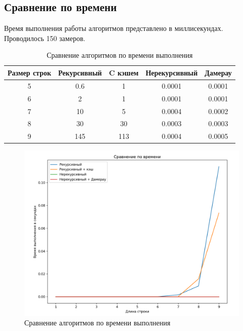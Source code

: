 \documentclass{article}
\begin{document}
\subsection{Сравнение  по времени}
Время выполнения работы алгоритмов представлено в миллисекундах. Проводилось 150 замеров.

\begin{table}[h]
	\begin{center}
	\caption{\label{tbl:all_time_cmp} Сравнение алгоритмов по времени выполнения}
	\begin{tabular}{|c|c|c|c|c|}
		\hline
		Размер строк & Рекурсивный & C кэшем &  Нерекурсивный & Дамерау
		\\ \hline
		5 & 0.6 & 1 & 0.0001 & 0.0001
		\\ \hline
		6 & 2 & 1 & 0.0001 & 0.0001
		\\ \hline
		7 & 10 & 5 & 0.0004 & 0.0002
		\\ \hline
		8 & 30 & 30 & 0.0003 & 0.0003
		\\ \hline
		9 & 145 & 113 & 0.0004 & 0.0005
		\\ \hline
	\end{tabular}
	\end{center}
\end{table}

\begin{figure}[h]
	\centering
	\includegraphics[scale=0.7]{tools/Screenshot_1.png}
	\caption{Сравнение алгоритмов по времени выполнения}
\end{figure}
\end{document}
